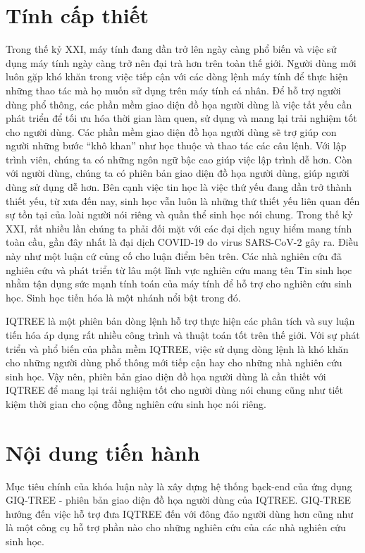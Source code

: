 \documentclass[12pt]{report}
\begin{document}
\section{Tính cấp thiết}
Trong thế kỷ XXI, máy tính đang dần trở lên ngày càng phổ biến và việc sử dụng máy tính ngày càng trở nên đại trà hơn trên toàn thế giới. Người dùng mới luôn gặp khó khăn trong việc tiếp cận với các dòng lệnh máy tính để thực hiện những thao tác mà họ muốn sử dụng trên máy tính cá nhân. Để hỗ trợ người dùng phổ thông, các phần mềm giao diện đồ họa người dùng là việc tất yếu cần phát triển để tối ưu hóa thời gian làm quen, sử dụng và mang lại trải nghiệm tốt cho người dùng. Các phần mềm giao diện đồ họa người dùng sẽ trợ giúp con người những bước “khô khan” như học thuộc và thao tác các câu lệnh. Với lập trình viên, chúng ta có những ngôn ngữ bậc cao giúp việc lập trình dễ hơn. Còn với người dùng, chúng ta có phiên bản giao diện đồ họa người dùng, giúp người dùng sử dụng dễ hơn.
Bên cạnh việc tin học là việc thứ yếu đang dần trở thành thiết yếu, từ xưa đến nay, sinh học vẫn luôn là những thứ thiết yếu liên quan đến sự tồn tại của loài người nói riêng và quần thể sinh học nói chung. Trong thế kỷ XXI, rất nhiều lần chúng ta phải đối mặt với các đại dịch nguy hiểm mang tính toàn cầu, gần đây nhất là đại dịch COVID-19 do virus SARS-CoV-2 gây ra. Điều này như một luận cứ củng cố cho luận điểm bên trên. Các nhà nghiên cứu đã nghiên cứu và phát triển từ lâu một lĩnh vực nghiên cứu mang tên Tin sinh học nhằm tận dụng sức mạnh tính toán của máy tính để hỗ trợ cho nghiên cứu sinh học. Sinh học tiến hóa là một nhánh nổi bật trong đó.

IQTREE là một phiên bản dòng lệnh hỗ trợ thực hiện các phân tích và suy luận tiến hóa áp dụng rất nhiều công trình và thuật toán tốt trên thế giới. Với sự phát triển và phổ biến của phần mềm IQTREE, việc sử dụng dòng lệnh là khó khăn cho những người dùng phổ thông mới tiếp cận hay cho những nhà nghiên cứu sinh học. Vậy nên, phiên bản giao diện đồ họa người dùng là cần thiết với IQTREE để mang lại trải nghiệm tốt cho người dùng nói chung cũng như tiết kiệm thời gian cho cộng đồng nghiên cứu sinh học nói riêng. 
\section{Nội dung tiến hành}
Mục tiêu chính của khóa luận này là xây dựng hệ thống bạck-end của ứng dụng GIQ-TREE - phiên bản giao diện đồ họa người dùng của IQTREE. GIQ-TREE hướng đến việc hỗ trợ đưa IQTREE đến với đông đảo người dùng hơn cũng như là một công cụ hỗ trợ phần nào cho những nghiên cứu của các nhà nghiên cứu sinh học.
\end{document}
